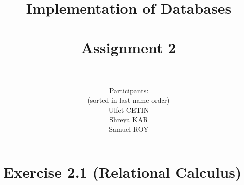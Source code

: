 \documentclass[10pt]{article}
\title{Implementation of Databases \\ ~~~ \\ Assignment 2 \\ ~~~ \\ }
\author{
	Participants:\\
	(sorted in last name order)\\
	Ulfet CETIN\\ 
	Shreya KAR\\
	Samuel ROY\\	
}
\date{}
\begin{document}
	\maketitle
	
	\clearpage
	
	\section*{Exercise 2.1 (Relational Calculus)}
	
	\begin{comment}
		symbol for element being in the set -> \in
		universal quant -> \forall
		existential quant -> \exists
		and symbol -> \land
		or symbol -> \lor
		curly brackets -> \{  \}
		list brackets -> [\ ]\
		for new lines -> \\ (use it at the end of the current line, not at the start of the new line)
		
		! be careful ! -> underscore(_) is also a special symbol in latex,
		so use \_ in place of _
		
		
	\end{comment}
	
\end{document}
